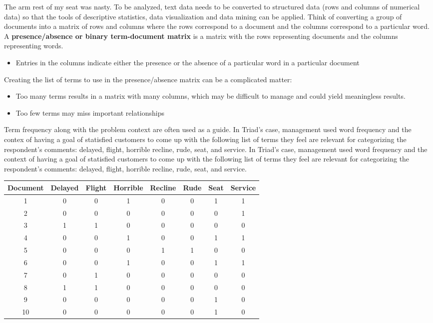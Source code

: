 \documentclass{report}
\begin{document}
\noindent The arm rest of my seat was nasty.
\newpage
\noindent
To be analyzed, text data needs to be converted to structured data (rows and columns of numerical data) so that the tools of descriptive statistics, data visualization and data mining can be applied.
\bigbreak \noindent
Think of converting a group of documents into a matrix of rows and columns where the rows correspond to a document and the columns correspond to a particular word.
\bigbreak \noindent
A \textbf{presence/absence or binary term-document matrix} is a matrix with the rows representing documents and the columns representing words.
\begin{itemize}[label=$\circ$]
  \item  Entries in the columns indicate either the presence or the absence of a particular word in a particular document
\end{itemize}
\bigbreak \noindent
Creating the list of terms to use in the presence/absence matrix can be a complicated matter:
\begin{itemize}
  \item Too many terms results in a matrix with many columns, which may be difficult to manage and could yield meaningless results. 
  \item Too few terms may miss important relationships
\end{itemize}
Term frequency along with the problem context are often used as a guide.
\bigbreak \noindent
In Triad's case, management used word frequency and the contex of having a goal of statisfied customers to come up with the following list of terms they feel are relevant for categorizing the respondent's comments: delayed, flight, horrible recline, rude, seat, and service. In Triad's case, management used word frequency and the context of having a goal of statisfied customers to come up with the following list of terms they feel are relevant for categorizing the respondent's comments: delayed, flight, horrible recline, rude, seat, and service.
\begin{table}[htbp]
  \centering
  \begin{tabular}{cccccccc}
    \toprule
    Document & Delayed & Flight & Horrible & Recline & Rude & Seat & Service \\
    \midrule
    1 & 0 & 0 & 1 & 0 & 0 & 1 & 1 \\
    2 & 0 & 0 & 0 & 0 & 0 & 0 & 1 \\
    3 & 1 & 1 & 0 & 0 & 0 & 0 & 0 \\
    4 & 0 & 0 & 1 & 0 & 0 & 1 & 1 \\
    5 & 0 & 0 & 0 & 1 & 1 & 0 & 0 \\
    6 & 0 & 0 & 1 & 0 & 0 & 1 & 1 \\
    7 & 0 & 1 & 0 & 0 & 0 & 0 & 0 \\
    8 & 1 & 1 & 0 & 0 & 0 & 0 & 0 \\
    9 & 0 & 0 & 0 & 0 & 0 & 1 & 0 \\
    10 & 0 & 0 & 0 & 0 & 0 & 1 & 0 \\
    \bottomrule
  \end{tabular}
\end{table}
\end{document}
